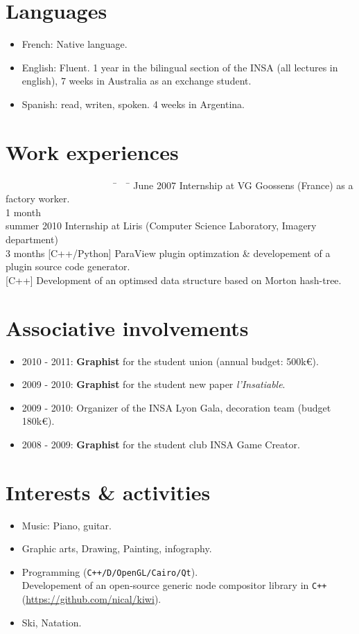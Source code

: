\section*{Languages}
	\begin{itemize}
		\item{French:} Native language.
		\item{English:} Fluent. 1 year in the bilingual section of the INSA (all lectures in english), 7 weeks in Australia as an exchange student.
		\item{Spanish:} read, writen, spoken. 4 weeks in Argentina.
	\end{itemize}
\section*{Work experiences}
	\begin{tabbing}
		~~~~~~~~~~~~~~~~~~~~~~~\= ~~\= \kill
		June 2007 \> Internship at VG Goossens (France) as a factory worker.\\
		1 month\\
		summer 2010 \> Internship at Liris (Computer Science Laboratory, Imagery department) \\ 3 months \> {\footnotesize \color{gray}[C++/Python]} ParaView plugin optimzation \& developement of a plugin source code generator.\\
		\> {\footnotesize \color{gray}[C++]} Development of an optimsed data structure based on Morton hash-tree.
	\end{tabbing}
\section*{Associative involvements }
	\begin{itemize}
	
		\item{2010 - 2011:} \textbf{Graphist} for the student union (annual budget: 500k€).
		\item{2009 - 2010:} \textbf{Graphist} for the student new paper \textit{l'Insatiable}.
		\item{2009 - 2010:} Organizer of the INSA Lyon Gala, decoration team (budget 180k€).
		\item{2008 - 2009:} \textbf{Graphist} for the student club INSA Game Creator.
	\end{itemize}
\section*{Interests \& activities }
	\begin{itemize}
		\item{Music:} Piano, guitar.
		\item{Graphic arts, Drawing, Painting, infography}.
		\item{Programming} (\texttt{C++/D/OpenGL/Cairo/Qt}). ~\\
			Developement of an open-source generic node compositor library in \texttt{C++} {\footnotesize(\url{https://github.com/nical/kiwi})}.
		\item Ski, Natation.
	\end{itemize}



